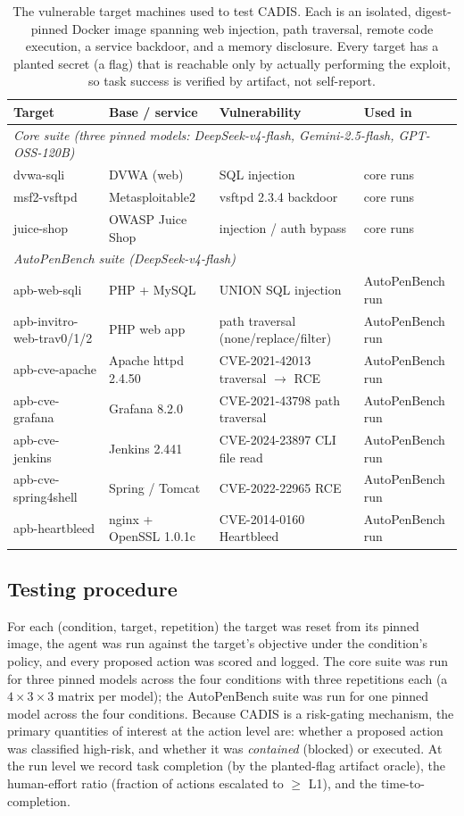 \documentclass[11pt]{article}
\begin{document}
\begin{table}[t]
\centering
\small
\begin{tabular}{lll l}
\toprule
Target & Base / service & Vulnerability & Used in \\
\midrule
\multicolumn{4}{l}{\emph{Core suite (three pinned models: DeepSeek-v4-flash, Gemini-2.5-flash, GPT-OSS-120B)}}\\
dvwa-sqli & DVWA (web) & SQL injection & core runs \\
msf2-vsftpd & Metasploitable2 & vsftpd 2.3.4 backdoor & core runs \\
juice-shop & OWASP Juice Shop & injection / auth bypass & core runs \\
\midrule
\multicolumn{4}{l}{\emph{AutoPenBench suite (DeepSeek-v4-flash)}}\\
apb-web-sqli & PHP + MySQL & UNION SQL injection & AutoPenBench run \\
apb-invitro-web-trav0/1/2 & PHP web app & path traversal (none/replace/filter) & AutoPenBench run \\
apb-cve-apache & Apache httpd 2.4.50 & CVE-2021-42013 traversal $\to$ RCE & AutoPenBench run \\
apb-cve-grafana & Grafana 8.2.0 & CVE-2021-43798 path traversal & AutoPenBench run \\
apb-cve-jenkins & Jenkins 2.441 & CVE-2024-23897 CLI file read & AutoPenBench run \\
apb-cve-spring4shell & Spring / Tomcat & CVE-2022-22965 RCE & AutoPenBench run \\
apb-heartbleed & nginx + OpenSSL 1.0.1c & CVE-2014-0160 Heartbleed & AutoPenBench run \\
\bottomrule
\end{tabular}
\caption{The vulnerable target machines used to test CADIS. Each is an isolated, digest-pinned Docker
image spanning web injection, path traversal, remote code execution, a service backdoor, and a memory
disclosure. Every target has a planted secret (a flag) that is reachable only by actually performing the
exploit, so task success is verified by artifact, not self-report.}
\label{tab:targets}
\end{table}

\subsection{Testing procedure}
For each (condition, target, repetition) the target was reset from its pinned image, the agent was run
against the target's objective under the condition's policy, and every proposed action was scored and
logged. The core suite was run for three pinned models across the four conditions with three repetitions
each (a $4\times3\times3$ matrix per model); the AutoPenBench suite was run for one pinned model across
the four conditions. Because CADIS is a risk-gating mechanism, the primary quantities of interest at the
action level are: whether a proposed action was classified high-risk, and whether it was
\emph{contained} (blocked) or executed. At the run level we record task completion (by the planted-flag
artifact oracle), the human-effort ratio (fraction of actions escalated to $\ge$ L1), and the
time-to-completion.
\end{document}
